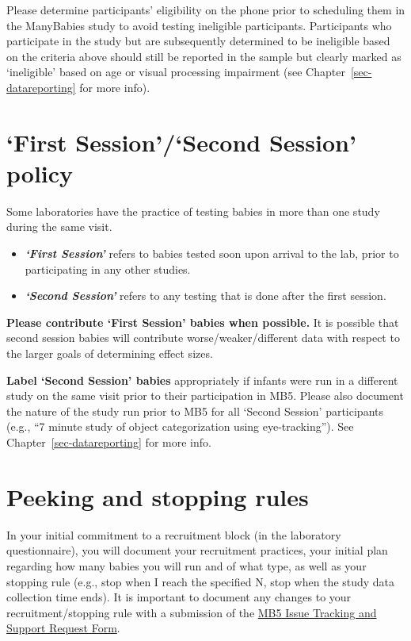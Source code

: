 \documentclass[
  letterpaper,
  DIV=11,
  numbers=noendperiod,
  oneside]{scrreprt}
\providecommand{\tightlist}{%
  \setlength{\itemsep}{0pt}\setlength{\parskip}{0pt}}
\begin{document}
Please determine participants' eligibility on the phone prior to
scheduling them in the ManyBabies study to avoid testing ineligible
participants. Participants who participate in the study but are
subsequently determined to be ineligible based on the criteria above
should still be reported in the sample but clearly marked as
`ineligible' based on age or visual processing impairment (see
Chapter~\ref{sec-datareporting} for more info).

\section{`First Session'/`Second Session'
policy}\label{first-sessionsecond-session-policy}

Some laboratories have the practice of testing babies in more than one
study during the same visit.

\begin{itemize}
\tightlist
\item
  \textbf{\emph{`First Session'}} refers to babies tested soon upon
  arrival to the lab, prior to participating in any other studies.
\item
  \textbf{\emph{`Second Session'}} refers to any testing that is done
  after the first session.
\end{itemize}

\textbf{Please contribute `First Session' babies when possible.} It is
possible that second session babies will contribute
worse/weaker/different data with respect to the larger goals of
determining effect sizes.

\textbf{Label `Second Session' babies} appropriately if infants were run
in a different study on the same visit prior to their participation in
MB5. Please also document the nature of the study run prior to MB5 for
all `Second Session' participants (e.g., ``7 minute study of object
categorization using eye-tracking''). See
Chapter~\ref{sec-datareporting} for more info.

\section{Peeking and stopping rules}\label{peeking-and-stopping-rules}

In your initial commitment to a recruitment block (in the laboratory
questionnaire), you will document your recruitment practices, your
initial plan regarding how many babies you will run and of what type, as
well as your stopping rule (e.g., stop when I reach the specified N,
stop when the study data collection time ends). It is important to
document any changes to your recruitment/stopping rule with a submission
of the
\href{https://airtable.com/appRoqMKzcK3NsXt4/pagGafhoHcuVMs7ZV/form}{MB5
Issue Tracking and Support Request Form}.
\end{document}
